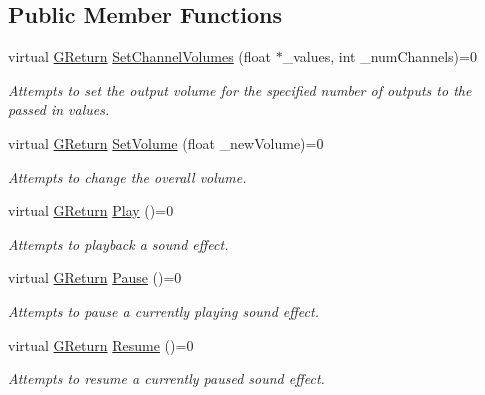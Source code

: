 \subsection*{Public Member Functions}
\begin{DoxyCompactItemize}
\item 
virtual \mbox{\hyperlink{namespace_g_w_a67a839e3df7ea8a5c5686613a7a3de21}{G\+Return}} \mbox{\hyperlink{class_g_w_1_1_a_u_d_i_o_1_1_g_sound_ac35f84bd0c936940bf641f9a937ca82a}{Set\+Channel\+Volumes}} (float $\ast$\+\_\+values, int \+\_\+num\+Channels)=0
\begin{DoxyCompactList}\small\item\em Attempts to set the output volume for the specified number of outputs to the passed in values. \end{DoxyCompactList}\item 
virtual \mbox{\hyperlink{namespace_g_w_a67a839e3df7ea8a5c5686613a7a3de21}{G\+Return}} \mbox{\hyperlink{class_g_w_1_1_a_u_d_i_o_1_1_g_sound_ad6d7995a245002485d8c2ec3a2051196}{Set\+Volume}} (float \+\_\+new\+Volume)=0
\begin{DoxyCompactList}\small\item\em Attempts to change the overall volume. \end{DoxyCompactList}\item 
virtual \mbox{\hyperlink{namespace_g_w_a67a839e3df7ea8a5c5686613a7a3de21}{G\+Return}} \mbox{\hyperlink{class_g_w_1_1_a_u_d_i_o_1_1_g_sound_ae8bb1895e457825d81ce9ab4494d7c66}{Play}} ()=0
\begin{DoxyCompactList}\small\item\em Attempts to playback a sound effect. \end{DoxyCompactList}\item 
virtual \mbox{\hyperlink{namespace_g_w_a67a839e3df7ea8a5c5686613a7a3de21}{G\+Return}} \mbox{\hyperlink{class_g_w_1_1_a_u_d_i_o_1_1_g_sound_ababa7089fe9bf95d2763e4fde9c5a746}{Pause}} ()=0
\begin{DoxyCompactList}\small\item\em Attempts to pause a currently playing sound effect. \end{DoxyCompactList}\item 
virtual \mbox{\hyperlink{namespace_g_w_a67a839e3df7ea8a5c5686613a7a3de21}{G\+Return}} \mbox{\hyperlink{class_g_w_1_1_a_u_d_i_o_1_1_g_sound_aae7e8c6cd723ba35d67e6c0ec2c4f794}{Resume}} ()=0
\begin{DoxyCompactList}\small\item\em Attempts to resume a currently paused sound effect. \end{DoxyCompactList}\item 

\end{DoxyCompactItemize}

